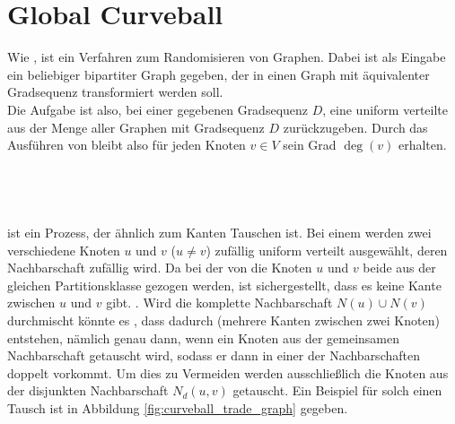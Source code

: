 \section{Global Curveball }
Wie , ist \gc ein Verfahren zum Randomisieren von Graphen.
Dabei ist als Eingabe ein beliebiger bipartiter Graph gegeben, der in einen 
Graph mit äquivalenter Gradsequenz transformiert werden soll.
\\
Die Aufgabe ist also, bei einer gegebenen Gradsequenz $D$, eine uniform verteilte 
aus der Menge aller Graphen mit Gradsequenz $D$ zurückzugeben. Durch das Ausführen von \gc 
bleibt also für jeden Knoten $v\in V$ sein Grad $\deg(v)$ erhalten. 
\\
\\
\\
\\
\\
\fett{\cb} ist  ein Prozess, der ähnlich zum Kanten Tauschen ist. Bei einem \ct werden
zwei verschiedene Knoten $u$ und $v$ ($u\neq v$) zufällig uniform verteilt ausgewählt, deren Nachbarschaft
zufällig  wird. Da bei der   von \cb{}
die Knoten $u$ und $v$ beide aus der gleichen Partitionsklasse gezogen werden, ist sichergestellt, dass
es keine Kante zwischen $u$ und $v$ gibt. .
Wird die komplette Nachbarschaft $N(u) \cup N(v)$ durchmischt könnte es , 
dass dadurch  (mehrere Kanten zwischen zwei Knoten) entstehen,  
nämlich genau dann, wenn ein Knoten aus der gemeinsamen Nachbarschaft getauscht wird, sodass er dann in 
einer der Nachbarschaften doppelt vorkommt.
Um dies zu Vermeiden werden ausschließlich die Knoten aus der disjunkten Nachbarschaft $N_{d}(u,v)$ getauscht.
Ein Beispiel für solch einen Tausch ist in Abbildung \ref{fig:curveball_trade_graph} gegeben.
%
%
%
